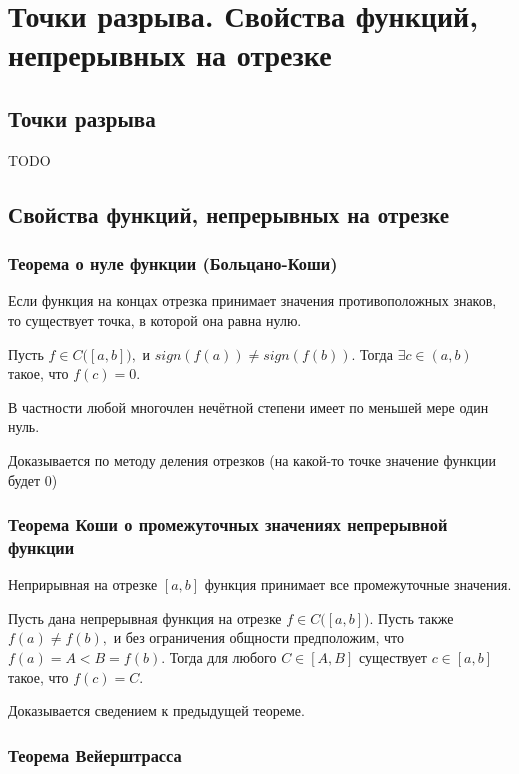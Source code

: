 \section{Точки разрыва. Свойства функций, непрерывных на отрезке}

\subsection{Точки разрыва}

TODO

\subsection{Свойства функций, непрерывных на отрезке}

\subsubsection{Теорема о нуле функции (Больцано-Коши)}

Если функция на концах отрезка принимает значения противоположных знаков, то существует точка, в которой она равна нулю.

Пусть $f\in C\bigl([a,b]\bigr),$ и $sign(f(a))\ne sign(f(b)).$ Тогда $\exists c \in (a,b)$ такое, что $f(c) = 0.$

В частности любой многочлен нечётной степени имеет по меньшей мере один нуль.

Доказывается по методу деления отрезков (на какой-то точке значение функции будет 0)

\subsubsection{Теорема Коши о промежуточных значениях непрерывной функции }

Неприрывная на отрезке $ [a,b] $ функция принимает все промежуточные значения.

Пусть дана непрерывная функция на отрезке $f\in C\bigl([a,b]\bigr).$ Пусть также $f(a) \neq f(b),$ и без ограничения общности предположим, что $f(a) = A < B = f(b).$ Тогда для любого $C \in [A,B]$ существует $c\in [a,b]$ такое, что $f(c)=C$.

Доказывается сведением к предыдущей теореме.

\subsubsection{Теорема Вейерштрасса}

